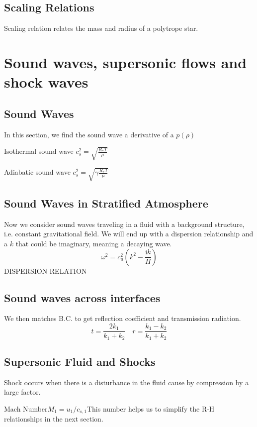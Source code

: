 \documentclass[12pt,a4paper]{article}
\begin{document}
    \subsection{Scaling Relations}
        Scaling relation relates the mass and radius of a polytrope star.
\section{Sound waves, supersonic flows and shock waves}
\subsection{Sound Waves}
    In this section, we find the sound wave a derivative of a $p(\rho)$

    \begin{example}
        {Isothermal sound wave }
        {$c^2_s=\sqrt{\frac{R_{*}T}{\mu}}$}
    \end{example}

    \begin{example}
        {Adiabatic sound wave }
        {$c^2_s=\sqrt{\gamma\frac{R_{*}T}{\mu}}$}
    \end{example}

\subsection{Sound Waves in Stratified Atmosphere}
    Now we consider sound waves traveling in a fluid with a background structure, i.e. constant gravitational field.
    We will end up with a dispersion relationship and a $k$ that could be imaginary, meaning a decaying wave.
    $$
    \omega^2=c_u^2\left(k^2-\frac{\mathrm{i} k}{H}\right)
    $$
    DISPERSION RELATION
\subsection{Sound waves across interfaces}
    We then matches B.C. to get reflection coefficient and transmission radiation.
    $$
    t=\frac{2 k_1}{k_1+k_2} \quad r=\frac{k_1-k_2}{k_1+k_2}
    $$
\subsection{Supersonic Fluid and Shocks}
    Shock occurs when there is a disturbance in the fluid cause by compression by a large factor.\\
    \begin{definition}
        {Mach Number}{$M_1= u_1/c_{s,1}$}{This number helps us to simplify the R-H relationships in the next section.}
    \end{definition}
\end{document}
